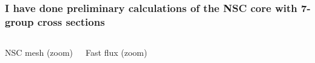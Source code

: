 \documentclass[compress,10pt]{beamer}
\begin{document}
\begin{frame}
    \frametitle{I have done preliminary calculations of the NSC core with 7-group cross sections}

    \centering
    \begin{columns}[c]


        \centering
        {\small NSC mesh (zoom)}


        \centering
        {\small Fast flux (zoom)}

    \end{columns}

    \begin{columns}[c]


        \centering


        \centering

    \end{columns}

\end{frame}

\typeout{***********************************************************************************}
\end{document}
